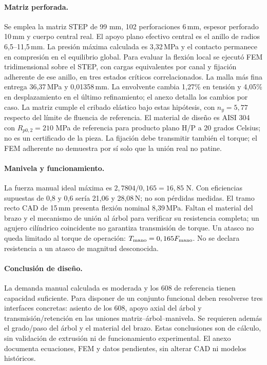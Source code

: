 \paragraph{Matriz perforada.}
Se emplea la matriz STEP de 99 mm, 102 perforaciones 6\,mm, espesor perforado
10\,mm y cuerpo central real. El apoyo plano efectivo central es el anillo
de radios 6,5--11,5\,mm. La presión máxima calculada es 3,32\,MPa y el
contacto permanece en compresión en el equilibrio global.
Para evaluar la flexión local se ejecutó FEM tridimensional sobre el STEP,
con cargas equivalentes por canal y fijación adherente de ese anillo,
en tres estados críticos correlacionados.
La malla más fina entrega 36,37\,MPa y 0,01358\,mm.
La envolvente cambia 1,27\% en tensión y 4,05\% en desplazamiento
en el último refinamiento; el anexo detalla los cambios por caso.
La matriz cumple el cribado elástico bajo estas hipótesis, con $n_y=5,77$ respecto del límite de fluencia de referencia.
El material de diseño es AISI 304 con $R_{p0,2}=210$ MPa de referencia para
producto plano H/P a 20 grados Celsius\cite{outokumpu_core_2026}; no es un
certificado de la pieza. La fijación debe transmitir también el torque;
el FEM adherente no demuestra por sí solo que la unión real no patine.

\paragraph{Manivela y funcionamiento.}
La fuerza manual ideal máxima es $2,7804/0,165=16,85$ N.
Con eficiencias supuestas de 0,8 y 0,6 sería 21,06 y 28,08\,N; no son pérdidas
medidas. El tramo recto CAD de 15\,mm presenta flexión nominal 8,39\,MPa.
Faltan el material del brazo y el mecanismo de unión al árbol para verificar
su resistencia completa; un agujero cilíndrico coincidente no garantiza
transmisión de torque. Un atasco no queda limitado al torque de operación:
$T_{\rm mano}=0,165F_{\rm mano}$. No se declara resistencia a un atasco
de magnitud desconocida.

\paragraph{Conclusión de diseño.}
La demanda manual calculada es moderada y los 608 de referencia tienen
capacidad suficiente. Para disponer de un conjunto funcional deben
resolverse tres interfaces concretas: asiento de los 608, apoyo axial del
árbol y transmisión/retención en las uniones matriz--árbol--manivela.
Se requieren además el grado/paso del árbol y el material del brazo.
Estas conclusiones son de cálculo, sin validación de extrusión ni de
funcionamiento experimental. El anexo documenta ecuaciones, FEM y datos
pendientes, sin alterar CAD ni modelos históricos.
